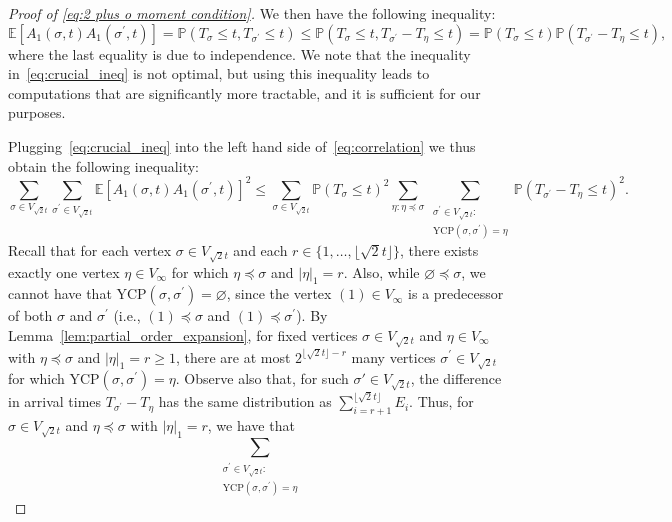\documentclass[11pt]{article}
\numberwithin{equation}{section}
\newcommand{\p}{\mathbb{P}} %
\newcommand{\E}{\mathbb{E}} %
\newcommand{\ycp}{\mathrm{YCP}} %
\theoremstyle{definition}
\begin{document}
\begin{proof}[Proof of \eqref{eq:2 plus o moment condition}]
We then have the following inequality: 
\begin{equation}\label{eq:crucial_ineq}
\E \left[  A_1(\sigma,t) A_1(\sigma^\prime,t)  \right]
= \p \left( T_{\sigma} \leq t, T_{\sigma^{\prime}} \leq t \right) 
\leq \p \left( T_{\sigma} \leq t, T_{\sigma^{\prime}} - T_{\eta} \leq t \right) 
= \p \left( T_{\sigma} \leq t \right) \p \left( T_{\sigma^{\prime}} - T_{\eta} \leq t \right),
\end{equation}
where the last equality is due to independence. 
We note that the inequality in~\eqref{eq:crucial_ineq} is not optimal, but using this inequality leads to computations that are significantly more tractable, and it is sufficient for our purposes. 

Plugging~\eqref{eq:crucial_ineq} into the left hand side of~\eqref{eq:correlation} we thus obtain the following inequality: 
\begin{equation}\label{eq:crucial_ineq2}
\sum_{\sigma \in V_{\sqrt{2}t}} \sum_{\sigma^\prime \in V_{\sqrt{2}t}}
\E \left[  A_1(\sigma,t) A_1(\sigma^\prime,t)  \right]^2
\leq
\sum_{\sigma \in V_{\sqrt{2}t}} \p \left(  T_{\sigma} \leq t \right)^2 \sum_{\eta: \eta \preccurlyeq \sigma} \sum_{\substack{\sigma^\prime \in V_{\sqrt{2}t}: \\ \ycp(\sigma, \sigma^\prime) = \eta}}
     \p \left( T_{\sigma^\prime} - T_\eta \leq t   \right)^{2}.
\end{equation} 
Recall that for each vertex $\sigma \in V_{\sqrt{2}t}$ and each $r \in \{1,\ldots,\lfloor \sqrt{2} t \rfloor\}$, there exists exactly one vertex $\eta \in V_{\infty}$ for which $\eta \preccurlyeq \sigma$ and $|\eta|_1=r$. 
Also, 
while $\varnothing \preccurlyeq \sigma$, 
we cannot have that 
$\ycp(\sigma, \sigma^\prime) = \varnothing$, 
since the vertex $(1) \in V_{\infty}$ is a predecessor of both $\sigma$ and $\sigma^{\prime}$ (i.e., $(1) \preccurlyeq \sigma$ and $(1) \preccurlyeq \sigma^{\prime}$). 
By Lemma~\ref{lem:partial_order_expansion}, 
for fixed vertices $\sigma \in V_{\sqrt{2}t}$ and $\eta \in V_\infty$ with $\eta \preccurlyeq \sigma$ and $|\eta|_{1} = r \geq 1$, there are at most $2^{\lfloor \sqrt{2}t \rfloor - r}$ many vertices $\sigma^\prime \in V_{\sqrt{2}t}$ for which $\ycp(\sigma, \sigma^\prime) = \eta$. 
Observe also that, for such $\sigma'\in V_{\sqrt{2}t}$,
the difference in arrival times $T_{\sigma^\prime}-T_\eta$ 
has the same distribution as $\sum_{i=r+1}^{\lfloor \sqrt{2} t \rfloor} E_{i}$. Thus, for $\sigma \in V_{\sqrt{2}t}$ and $\eta \preccurlyeq \sigma$ with $|\eta|_1 = r$, we have that 
$$\sum_{\substack{\sigma^\prime \in V_{\sqrt{2}t}: \\ \ycp(\sigma, \sigma^\prime) = \eta}}
$$
\end{proof}
\end{document}
